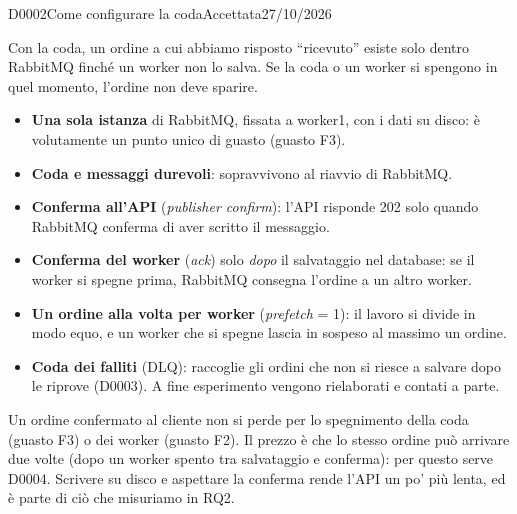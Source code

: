 \begin{decisione}{D0002}{Come configurare la coda}{Accettata}{27/10/2026}

\contesto
Con la coda, un ordine a cui abbiamo risposto ``ricevuto'' esiste solo dentro RabbitMQ finché un worker non lo salva. Se la coda o un worker si spengono in quel momento, l'ordine non deve sparire.

\scelta
\begin{itemize}
  \item \textbf{Una sola istanza} di RabbitMQ, fissata a worker1, con i dati su disco: è volutamente un punto unico di guasto (guasto F3).
  \item \textbf{Coda e messaggi durevoli}: sopravvivono al riavvio di RabbitMQ.
  \item \textbf{Conferma all'API} (\textit{publisher confirm}): l'API risponde 202 solo quando RabbitMQ conferma di aver scritto il messaggio.
  \item \textbf{Conferma del worker} (\textit{ack}) solo \emph{dopo} il salvataggio nel database: se il worker si spegne prima, RabbitMQ consegna l'ordine a un altro worker.
  \item \textbf{Un ordine alla volta per worker} (\textit{prefetch} = 1): il lavoro si divide in modo equo, e un worker che si spegne lascia in sospeso al massimo un ordine.
  \item \textbf{Coda dei falliti} (DLQ): raccoglie gli ordini che non si riesce a salvare dopo le riprove (D0003). A fine esperimento vengono rielaborati e contati a parte.
\end{itemize}

\conseguenze
Un ordine confermato al cliente non si perde per lo spegnimento della coda (guasto F3) o dei worker (guasto F2). Il prezzo è che lo stesso ordine può arrivare due volte (dopo un worker spento tra salvataggio e conferma): per questo serve D0004. Scrivere su disco e aspettare la conferma rende l'API un po' più lenta, ed è parte di ciò che misuriamo in RQ2.

\end{decisione}
